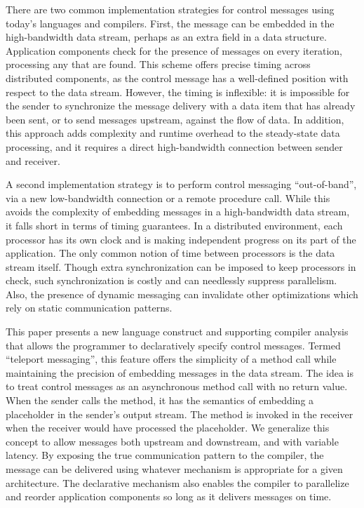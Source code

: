There are two common implementation strategies for control messages
using today's languages and compilers.  First, the message can be
embedded in the high-bandwidth data stream, perhaps as an extra field
in a data structure.  Application components check for the presence of
messages on every iteration, processing any that are found.  This
scheme offers precise timing across distributed components, as the
control message has a well-defined position with respect to the data
stream.  However, the timing is inflexible: it is impossible for the
sender to synchronize the message delivery with a data item that has
already been sent, or to send messages upstream, against the flow of
data.  In addition, this approach adds complexity and runtime overhead
to the steady-state data processing, and it requires a direct
high-bandwidth connection between sender and receiver.

A second implementation strategy is to perform control messaging
``out-of-band'', via a new low-bandwidth connection or a remote
procedure call.  While this avoids the complexity of embedding
messages in a high-bandwidth data stream, it falls short in terms of
timing guarantees.  In a distributed environment, each processor has
its own clock and is making independent progress on its part of the
application.  The only common notion of time between processors is the
data stream itself.  Though extra synchronization can be imposed to
keep processors in check, such synchronization is costly and can
needlessly suppress parallelism.  Also, the presence of dynamic
messaging can invalidate other optimizations which rely on static
communication patterns.

This paper presents a new language construct and supporting compiler
analysis that allows the programmer to declaratively specify control
messages.  Termed ``teleport messaging'', this feature offers the
simplicity of a method call while maintaining the precision of
embedding messages in the data stream.  The idea is to treat control
messages as an asynchronous method call with no return value.  When
the sender calls the method, it has the semantics of embedding a
placeholder in the sender's output stream.  The method is invoked in
the receiver when the receiver would have processed the placeholder.
We generalize this concept to allow messages both upstream and
downstream, and with variable latency.  By exposing the true
communication pattern to the compiler, the message can be delivered
using whatever mechanism is appropriate for a given architecture.  The
declarative mechanism also enables the compiler to parallelize and
reorder application components so long as it delivers messages on
time.

